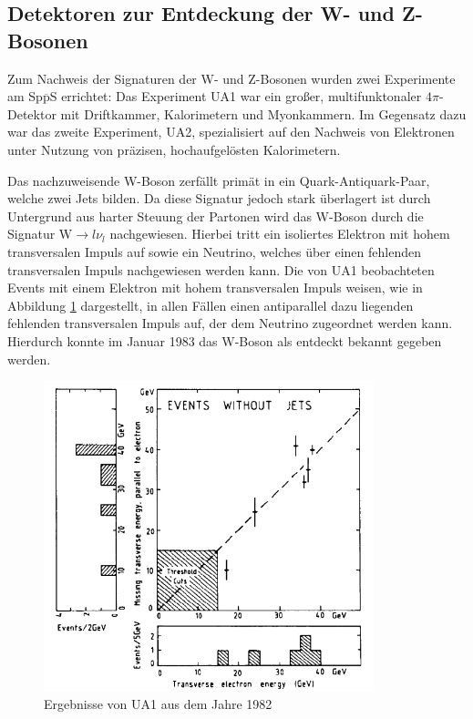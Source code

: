 \subsection{Detektoren zur Entdeckung der W- und Z-Bosonen}

Zum Nachweis der Signaturen der W- und Z-Bosonen wurden zwei Experimente am Sp$\overline{\text{p}}$S errichtet:
Das Experiment UA1 war ein großer, multifunktonaler $4\pi$-Detektor mit Driftkammer, Kalorimetern und Myonkammern.
Im Gegensatz dazu war das zweite Experiment, UA2, spezialisiert auf den Nachweis von Elektronen unter Nutzung von präzisen, hochaufgelösten Kalorimetern.

Das nachzuweisende W-Boson zerfällt primät in ein Quark-Antiquark-Paar, welche zwei Jets bilden.
Da diese Signatur jedoch stark überlagert ist durch Untergrund aus harter Steuung der Partonen wird das W-Boson durch die Signatur $\text{W} \rightarrow l \nu_l$ nachgewiesen.
Hierbei tritt ein isoliertes Elektron mit hohem transversalen Impuls auf sowie ein Neutrino, welches über einen fehlenden transversalen Impuls nachgewiesen werden kann.
Die von UA1 beobachteten Events mit einem Elektron mit hohem transversalen Impuls weisen, wie in Abbildung \ref{fig:boson} dargestellt, in allen Fällen einen antiparallel dazu liegenden fehlenden transversalen Impuls auf, der dem Neutrino zugeordnet werden kann.
Hierdurch konnte im Januar 1983 das W-Boson als entdeckt bekannt gegeben werden.

\begin{figure}
  \centering
  \includegraphics[height=9.0cm]{ressources/Screenshot_2018-12-04_18-22-25.png}
  \caption{Ergebnisse von UA1 aus dem Jahre 1982 \cite{boson}}
  \label{fig:boson}
\end{figure}

